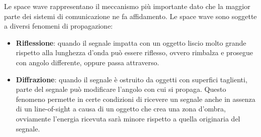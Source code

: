 Le space wave rappresentano il meccanismo più importante dato che la maggior parte dei sistemi di comunicazione ne fa affidamento. Le space wave sono soggette a diversi fenomeni di propagazione:
\begin{itemize}
    \item \textbf{Riflessione}: quando il segnale impatta con un oggetto liscio molto grande rispetto alla lunghezza d'onda può essere riflesso, ovvero rimbalza e prosegue con angolo differente, oppure passa attraverso.
    \begin{center}
    \end{center}



    
   
    \item \textbf{Diffrazione}: quando il segnale è ostruito da oggetti con superfici taglienti, parte del segnale può modificare l'angolo con cui si propaga. Questo fenomeno permette in certe condizioni di ricevere un segnale anche in assenza di un line-of-sight a causa di un oggetto che crea una zona d'ombra, ovviamente l'energia ricevuta sarà minore rispetto a quella originaria del segnale.
    \begin{center}
    \end{center}



\end{itemize}
